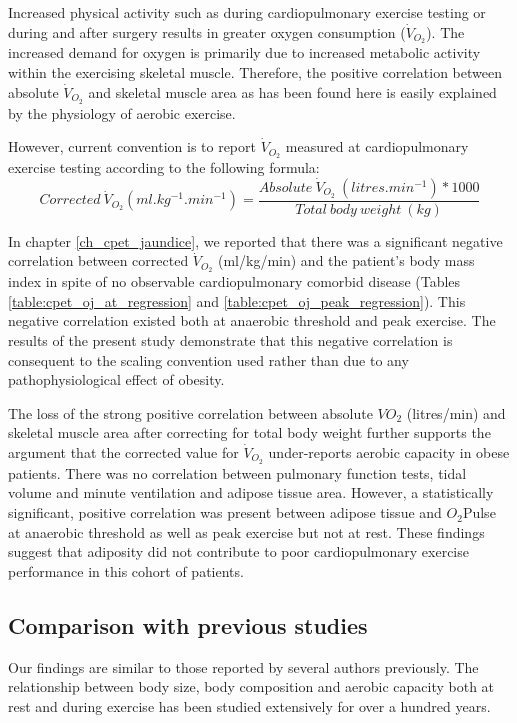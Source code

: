 Increased physical activity such as during cardiopulmonary exercise testing or during and after surgery results in greater oxygen consumption ($\dot{V}_{O_2}$). 
The increased demand for oxygen is primarily due to increased metabolic activity within the exercising skeletal muscle.
Therefore, the positive correlation between absolute $\dot{V}_{O_2}$ and skeletal muscle area as has been found here is easily explained by the physiology of aerobic exercise. 

However, current convention is to report $\dot{V}_{O_2}$ measured at cardiopulmonary exercise testing according to the following formula: 
\[Corrected\ \dot{V}_{O_2} (ml.kg^{-1}.min^{-1}) = \frac{Absolute\ \dot{V}_{O_2}\ (litres.min^{-1}) * 1000}{Total\ body\ weight\ (kg)}\]

In chapter \ref{ch_cpet_jaundice}, we reported that there was a significant negative correlation between corrected $\dot{V}_{O_2}$ (ml/kg/min) and the patient's body mass index in spite of no observable cardiopulmonary comorbid disease (Tables \ref{table:cpet_oj_at_regression} and \ref{table:cpet_oj_peak_regression}). 
This negative correlation existed both at anaerobic threshold and peak exercise.
The results of the present study demonstrate that this negative correlation is consequent to the scaling convention used rather than due to any pathophysiological effect of obesity. 

The loss of the strong positive correlation between absolute $VO_{2}$ (litres/min) and skeletal muscle area after correcting for total body weight further supports the argument that the corrected value for $\dot{V}_{O_2}$ under-reports aerobic capacity in obese patients. 
There was no correlation between pulmonary function tests, tidal volume and minute ventilation and adipose tissue area. 
However, a statistically significant, positive correlation was present between adipose tissue and $O_2$Pulse at anaerobic threshold as well as peak exercise but not at rest.
These findings suggest that adiposity did not contribute to poor cardiopulmonary exercise performance in this cohort of patients.

\subsection{Comparison with previous studies}
Our findings are similar to those reported by several authors previously. 
The relationship between body size, body composition and aerobic capacity both at rest and during exercise has been studied extensively for over a hundred years.

